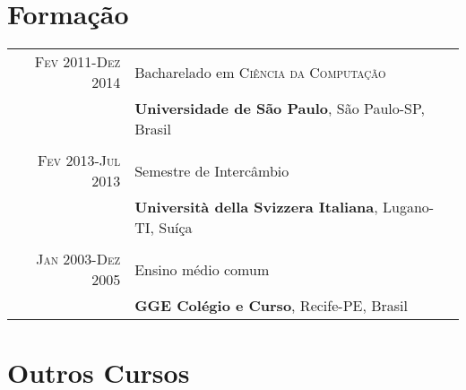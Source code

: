 \documentclass[a4paper,10pt]{article} %
\begin{document}

\section{Formação}

\begin{tabular}{r|p{11cm}}
\textsc{Fev} 2011-\textsc{Dez} 2014& Bacharelado em \textsc{}\textsc{Ciência da Computação} \\& \normalsize\textbf{Universidade de São Paulo}, São Paulo-SP, Brasil\\
\multicolumn{2}{c}{}\\


\textsc{Fev} 2013-\textsc{Jul} 2013 & Semestre de Intercâmbio\\& \textbf{Università della Svizzera Italiana}, Lugano-TI, Suíça\\
\multicolumn{2}{c}{} \\
    

\textsc{Jan} 2003-\textsc{Dez} 2005& Ensino médio comum\\&\textbf{GGE Colégio e Curso}, Recife-PE, Brasil\\
\end{tabular}

\section{Outros Cursos}
\end{document}
